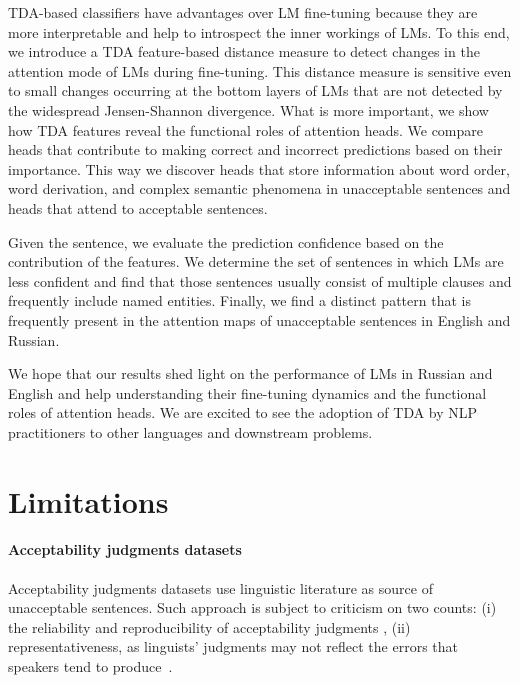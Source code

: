 \documentclass[11pt]{article}
\begin{document}
TDA-based classifiers have advantages over LM fine-tuning because they are more interpretable and help to introspect the inner workings of LMs. 
To this end, we introduce a TDA feature-based distance measure to detect changes in the attention mode of LMs during fine-tuning. 
This distance measure is sensitive even to small changes occurring at the bottom layers of LMs that are not detected by the widespread Jensen-Shannon divergence. 
What is more important, we show how TDA features reveal the functional roles of attention heads. 
We compare heads that contribute to making correct and incorrect predictions based on their importance. 
This way we discover heads that store information about word order, word derivation, and complex semantic phenomena in unacceptable sentences and heads that attend to acceptable sentences.  

Given the sentence, we evaluate the prediction confidence based on the contribution of the features.  
We determine the set of sentences in which LMs are less confident and find that those sentences usually consist of multiple clauses and frequently include named entities.   
Finally, we find a distinct pattern  that is frequently present in the attention maps of unacceptable sentences in English and Russian.

We hope that our results shed light on the performance of LMs in Russian and English and help understanding their fine-tuning dynamics and the functional roles of attention heads. We are excited to see the adoption of TDA by NLP practitioners to other languages and downstream problems. 








\section*{Limitations} 

\paragraph{Acceptability judgments datasets} Acceptability judgments datasets use linguistic literature as source of unacceptable sentences. Such approach is subject to criticism on two counts: (i) 
 the reliability and reproducibility of acceptability judgments  \cite{gibson2013need,culicover2010quantitative,sprouse2013empirical,linzen2018reliability},  (ii) representativeness, as linguists' judgments may not reflect the errors that speakers tend to produce~\cite{dkabrowska2010naive}.
\end{document}

